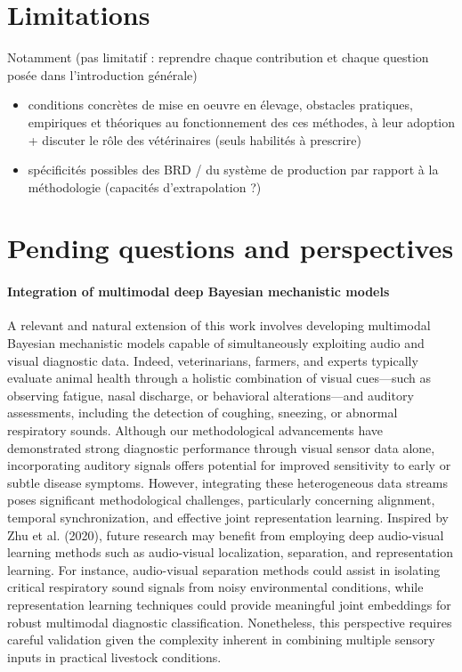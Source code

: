 \section{Limitations}
Notamment (pas limitatif : reprendre chaque contribution et chaque question posée dans l'introduction générale)
\begin{itemize}
    \item conditions concrètes de mise en oeuvre en élevage, obstacles pratiques, empiriques et théoriques au fonctionnement des ces méthodes, à leur adoption + discuter le rôle des vétérinaires (seuls habilités à prescrire)
    \item spécificités possibles des BRD / du système de production par rapport à la méthodologie (capacités d'extrapolation ?)
\end{itemize}

\section{Pending questions and perspectives}



\paragraph{Integration of multimodal deep Bayesian mechanistic models} A relevant and natural extension of this work involves developing multimodal Bayesian mechanistic models capable of simultaneously exploiting audio and visual diagnostic data. Indeed, veterinarians, farmers, and experts typically evaluate animal health through a holistic combination of visual cues—such as observing fatigue, nasal discharge, or behavioral alterations—and auditory assessments, including the detection of coughing, sneezing, or abnormal respiratory sounds. Although our methodological advancements have demonstrated strong diagnostic performance through visual sensor data alone, incorporating auditory signals offers potential for improved sensitivity to early or subtle disease symptoms. However, integrating these heterogeneous data streams poses significant methodological challenges, particularly concerning alignment, temporal synchronization, and effective joint representation learning. Inspired by Zhu et al. (2020), future research may benefit from employing deep audio-visual learning methods such as audio-visual localization, separation, and representation learning. For instance, audio-visual separation methods could assist in isolating critical respiratory sound signals from noisy environmental conditions, while representation learning techniques could provide meaningful joint embeddings for robust multimodal diagnostic classification. Nonetheless, this perspective requires careful validation given the complexity inherent in combining multiple sensory inputs in practical livestock conditions.
 
